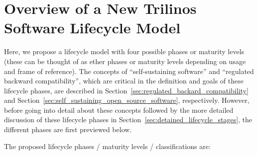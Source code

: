 \documentclass[11pt]{SANDreport}
\begin{document}
%
{}\section{Overview of a New Trilinos Software Lifecycle Model}
\label{sec:life_cycle_overview}
%

Here, we propose a lifecycle model with four possible phases or
maturity levels (these can be thought of as ether phases or maturity
levels depending on usage and frame of reference).  The concepts of
``self-sustaining software'' and ``regulated backward compatibility'',
which are critical in the definition and goals of these lifecycle
phases, are described in
Section~\ref{sec:regulated_backard_compatibility} and
Section~\ref{sec:self_sustaining_open_source_software}, respectively.
However, before going into detail about these concepts followed by the
more detailed discussion of these lifecycle phases in
Section~\ref{sec:detained_lifecycle_stages}, the different phases are
first previewed below.

The proposed lifecycle phases / maturity levels / classifications are:
\end{document}
